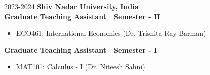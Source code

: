\datedsubsection{ }
{%
    2023-2024}
{%
    \textbf{Shiv Nadar University, India}
} \\

\textbf{Graduate Teaching Assistant | Semester - II}
{%
    \begin{itemize}
        \item ECO461: International Economics (Dr. Trishita Ray Barman)     
    \end{itemize}
}
\textbf{Graduate Teaching Assistant | Semester - I}
{%
    \begin{itemize}
        \item MAT101: Calculus - I (Dr. Niteesh Sahni)     
    \end{itemize}
}

